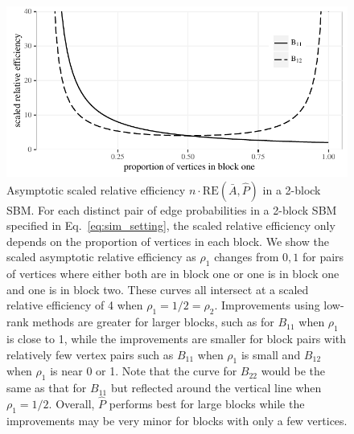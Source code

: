 \begin{figure}[!t]
\centering
\includegraphics[width=1\textwidth]{./Figures/Rho.pdf}
\caption[Asymptotic scaled relative efficiency in a 2-block SBM]{Asymptotic scaled relative efficiency $n \cdot \mathrm{RE}(\bar{A},\hat{P})$ in a 2-block SBM.
For each distinct pair of edge probabilities in a 2-block SBM specified in Eq.~\ref{eq:sim_setting}, the scaled relative efficiency only depends on the proportion of vertices in each block.
We show the scaled asymptotic relative efficiency as $\rho_1$ changes from $0,1$ for pairs of vertices where either both are in block one or one is in block one and one is in block two. 
These curves all intersect at a scaled relative efficiency of 4 when $\rho_1=1/2=\rho_2$.
Improvements using low-rank methods are greater for larger blocks, such as for $B_{11}$ when $\rho_1$ is close to 1, while the improvements are smaller for block pairs with relatively few vertex pairs such as $B_{11}$ when $\rho_1$ is small and $B_{12}$ when $\rho_1$ is near 0 or 1.
Note that the curve for $B_{22}$ would be the same as that for $B_{11}$ but reflected around the vertical line when $\rho_1=1/2$.
Overall, $\hat{P}$ performs best for large blocks while the improvements may be very minor for blocks with only a few vertices.}
\label{fig:RErho}
\end{figure}

